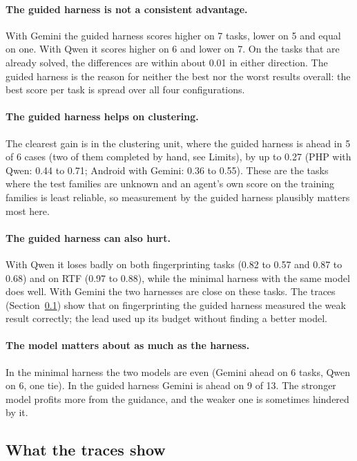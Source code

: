 \documentclass[letterpaper,twocolumn,10pt]{article}
\begin{document}
\paragraph{The guided harness is not a consistent advantage.} With Gemini the
guided harness scores higher on 7 tasks, lower on 5 and equal on one. With
Qwen it scores higher on 6 and lower on 7. On the tasks that are already
solved, the differences are within about 0.01 in either direction. The
guided harness is the reason for neither the best nor the worst results overall:
the best score per task is spread over all four configurations.

\paragraph{The guided harness helps on clustering.} The clearest gain is in the
clustering unit, where the guided harness is ahead in 5 of 6 cases (two of
them completed by hand, see Limits), by up to
0.27 (PHP with Qwen: 0.44 to 0.71; Android with Gemini: 0.36 to 0.55).
These are the tasks where the test families are unknown and an agent's own
score on the training families is least reliable, so measurement by the
guided harness plausibly matters most here.

\paragraph{The guided harness can also hurt.} With Qwen it loses
badly on both fingerprinting tasks (0.82 to 0.57 and 0.87 to 0.68) and on
RTF (0.97 to 0.88), while the minimal harness with the same model does well.
With Gemini the two harnesses are close on these tasks. The traces
(Section~\ref{sec:traces}) show that on fingerprinting the guided harness measured
the weak result correctly; the lead used up its budget without finding a
better model.

\paragraph{The model matters about as much as the harness.} In the minimal
harness the two models are even (Gemini ahead on 6 tasks, Qwen on 6, one tie). In the
guided harness Gemini is ahead on 9 of 13. The stronger model profits more
from the guidance, and the weaker one is sometimes hindered by it.

\subsection{What the traces show}
\label{sec:traces}
\end{document}
